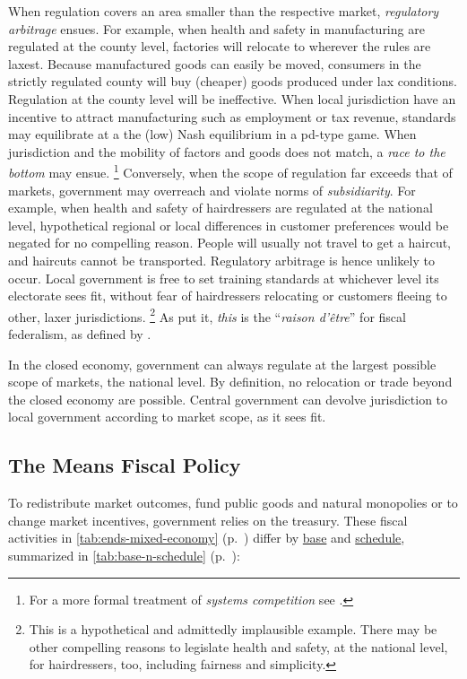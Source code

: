 \begin{description}
	When regulation covers an area smaller than the respective market, \emph{regulatory arbitrage} ensues.
	For example, when health and safety in manufacturing are regulated at the county level, factories will relocate to wherever the rules are laxest.
	Because manufactured goods can easily be moved, consumers in the strictly regulated county will buy (cheaper) goods produced under lax conditions.
	Regulation at the county level will be ineffective.
	When local jurisdiction have an incentive to attract manufacturing such as employment or tax revenue, standards may equilibrate at a the (low) Nash equilibrium in a \gls{pd}-type game.
	When jurisdiction and the mobility of factors and goods does not match, a \emph{race to the bottom} may ensue.
	\footnote{
		For a more formal treatment of \emph{systems competition} see \cite{Sinn2004}.
	}
	Conversely, when the scope of regulation far exceeds that of markets, government may overreach and violate norms of \emph{subsidiarity}.
	For example, when health and safety of hairdressers are regulated at the national level, hypothetical regional or local differences in customer preferences would be negated for no compelling reason.
	People will usually not travel to get a haircut, and haircuts cannot be transported.
	Regulatory arbitrage is hence unlikely to occur.
	Local government is free to set training standards at whichever level its electorate sees fit, without fear of hairdressers relocating or customers fleeing to other, laxer jurisdictions.
	\footnote{
		This is a hypothetical and admittedly implausible example.
		There may be other compelling reasons to legislate health and safety, at the national level, for hairdressers, too, including fairness and simplicity.
	}
	As \citeauthor{Bordo2011} put it, \emph{this} is the ``\emph{raison d'\^{e}tre}'' \citeyearpar[4]{Bordo2011} for fiscal federalism, as defined by \cite{Oates1972}.

	In the closed economy, government can always regulate at the largest possible scope of markets, the national level.
	By definition, no relocation or trade beyond the closed economy are possible.
	Central government can devolve jurisdiction to local government according to market scope, as it sees fit.
\end{description}

\subsection[Fiscal Policy]{The Means Fiscal Policy}
\label{sec:fiscal}
To redistribute market outcomes, fund public goods and natural monopolies or to change market incentives, government relies on the treasury.
These fiscal activities in \autoref{tab:ends-mixed-economy} (p.~\pageref{tab:ends-mixed-economy}) differ by \hyperref[itm:base]{base} and \hyperref[itm:schedule]{schedule}, summarized in \autoref{tab:base-n-schedule} (p.~\pageref{tab:base-n-schedule}):

